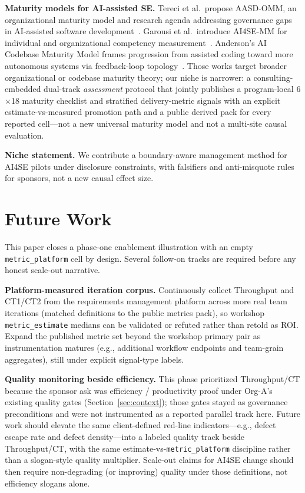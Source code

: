 \documentclass[10pt,conference]{IEEEtran}
\begin{document}
\textbf{Maturity models for AI-assisted SE.}
Tereci et al.\ propose AASD-OMM, an organizational maturity model and research agenda addressing governance gaps in AI-assisted software development~\cite{Tereci2026AASD}.
Garousi et al.\ introduce AI4SE-MM for individual and organizational competency measurement~\cite{Garousi2025AI4SEMM}.
Anderson's AI Codebase Maturity Model frames progression from assisted coding toward more autonomous systems via feedback-loop topology~\cite{Anderson2026ACMM}.
Those works target broader organizational or codebase maturity theory; our niche is narrower: a consulting-embedded dual-track \emph{assessment} protocol that jointly publishes a program-local 6$\times$18 maturity checklist and stratified delivery-metric signals with an explicit estimate-vs-measured promotion path and a public derived pack for every reported cell---not a new universal maturity model and not a multi-site causal evaluation.

\textbf{Niche statement.}
We contribute a boundary-aware management method for AI4SE pilots under disclosure constraints, with falsifiers and anti-misquote rules for sponsors, not a new causal effect size.

\section{Future Work}
\label{sec:future}

This paper closes a phase-one enablement illustration with an empty \texttt{metric\_platform} cell by design.
Several follow-on tracks are required before any honest scale-out narrative.

\textbf{Platform-measured iteration corpus.}
Continuously collect Throughput and CT1/CT2 from the requirements management platform across more real team iterations (matched definitions to the public metrics pack), so workshop \texttt{metric\_estimate} medians can be validated or refuted rather than retold as ROI.
Expand the published metric set beyond the workshop primary pair as instrumentation matures (e.g., additional workflow endpoints and team-grain aggregates), still under explicit signal-type labels.

\textbf{Quality monitoring beside efficiency.}
This phase prioritized Throughput/CT because the sponsor ask was efficiency / productivity proof under Org-A's existing quality gates (Section~\ref{sec:context}); those gates stayed as governance preconditions and were not instrumented as a reported parallel track here.
Future work should elevate the same client-defined red-line indicators---e.g., defect escape rate and defect density---into a labeled quality track beside Throughput/CT, with the same estimate-vs-\texttt{metric\_platform} discipline rather than a slogan-style quality multiplier.
Scale-out claims for AI4SE change should then require non-degrading (or improving) quality under those definitions, not efficiency slogans alone.
\end{document}
